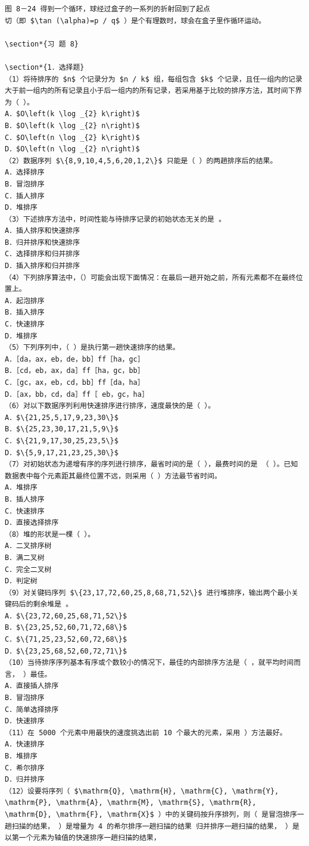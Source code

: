 \documentclass[10pt]{article}
\begin{document}
\begin{verbatim}
图 8－24 得到一个循环，球经过盒子的一系列的折射回到了起点
切（即 $\tan (\alpha)=p / q$ ）是个有理数时，球会在盒子里作循环运动。

\section*{习 题 8}

\section*{1．选择题}
（1）将待排序的 $n$ 个记录分为 $n / k$ 组，每组包含 $k$ 个记录，且任一组内的记录大于前一组内的所有记录且小于后一组内的所有记录，若采用基于比较的排序方法，其时间下界为（ ）。
A．$O\left(k \log _{2} k\right)$
B．$O\left(k \log _{2} n\right)$
C．$O\left(n \log _{2} k\right)$
D．$O\left(n \log _{2} n\right)$
（2）数据序列 $\{8,9,10,4,5,6,20,1,2\}$ 只能是（ ）的两趟排序后的结果。
A．选择排序
B．冒泡排序
C．插人排序
D．堆排序
（3）下述排序方法中，时间性能与待排序记录的初始状态无关的是 。
A．插人排序和快速排序
B．归并排序和快速排序
C．选择排序和归并排序
D．插入排序和归并排序
（4）下列排序算法中，（）可能会出现下面情况：在最后一趟开始之前，所有元素都不在最终位置上。
A．起泡排序
B．插入排序
C．快速排序
D．堆排序
（5）下列序列中，（ ）是执行第一趟快速排序的结果。
A．［da，ax，eb，de，bb］ff［ha，gc］
B．［cd，eb，ax，da］ff［ha，gc，bb］
C．［gc，ax，eb，cd，bb］ff［da，ha］
D．［ax，bb，cd，da］ff［ eb，gc，ha］
（6）对以下数据序列利用快速排序进行排序，速度最快的是（ ）。
A．$\{21,25,5,17,9,23,30\}$
B．$\{25,23,30,17,21,5,9\}$
C．$\{21,9,17,30,25,23,5\}$
D．$\{5,9,17,21,23,25,30\}$
（7）对初始状态为递增有序的序列进行排序，最省时间的是（ ），最费时间的是 （ ）。已知数据表中每个元素距其最终位置不远，则采用（ ）方法最节省时间。
A．堆排序
B．插人排序
C．快速排序
D．直接选择排序
（8）堆的形状是一棵（ ）。
A．二叉排序树
B．满二叉树
C．完全二叉树
D．判定树
（9）对关键码序列 $\{23,17,72,60,25,8,68,71,52\}$ 进行堆排序，输出两个最小关键码后的剩余堆是 。
A．$\{23,72,60,25,68,71,52\}$
B．$\{23,25,52,60,71,72,68\}$
C．$\{71,25,23,52,60,72,68\}$
D．$\{23,25,68,52,60,72,71\}$
（10）当待排序序列基本有序或个数较小的情况下，最佳的内部排序方法是（ ，就平均时间而言， ）最佳。
A．直接插人排序
B．冒泡排序
C．简单选择排序
D．快速排序
（11）在 5000 个元素中用最快的速度挑选出前 10 个最大的元素，采用 ）方法最好。
A．快速排序
B．堆排序
C．希尔排序
D．归并排序
（12）设要将序列（ $\mathrm{Q}, \mathrm{H}, \mathrm{C}, \mathrm{Y}, \mathrm{P}, \mathrm{A}, \mathrm{M}, \mathrm{S}, \mathrm{R}, \mathrm{D}, \mathrm{F}, \mathrm{X}$ ）中的关键码按升序排列，则（ 是冒泡排序一趟扫描的结果， ）是增量为 4 的希尔排序一趟扫描的结果 归并排序一趟扫描的结果， ）是以第一个元素为轴值的快速排序一趟扫描的结果，

\end{verbatim}
\end{document}
